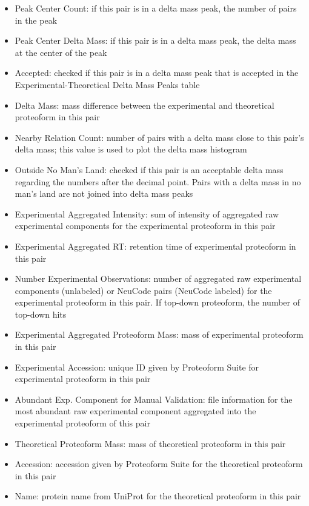\begin{itemize}
\begin{figure}[h]
\end{figure}
\begin{itemize}
	\item Peak Center Count: if this pair is in a delta mass peak, the number of pairs in the peak
	\item Peak Center Delta Mass: if this pair is in a delta mass peak, the delta mass at the center of the peak
	\item Accepted: checked if this pair is in a delta mass peak that is accepted in the Experimental-Theoretical Delta Mass Peaks table
	\item Delta Mass: mass difference between the experimental and theoretical proteoform in this pair
	\item Nearby Relation Count: number of pairs with a delta mass close to this pair's delta mass; this value is used to plot the delta mass histogram
	\item Outside No Man's Land: checked if this pair is an acceptable delta mass regarding the numbers after the decimal point. Pairs with a delta mass in no man's land are not joined into delta mass peaks
	\item Experimental Aggregated Intensity: sum of intensity of aggregated raw experimental components for the experimental proteoform in this pair
	\item Experimental Aggregated RT: retention time of experimental proteoform in this pair
	\item Number Experimental Observations: number of aggregated raw experimental components (unlabeled) or NeuCode pairs (NeuCode labeled) for the experimental proteoform in this pair. If top-down proteoform, the number of top-down hits
	\item Experimental Aggregated Proteoform Mass: mass of experimental proteoform in this pair
	\item Experimental Accession: unique ID given by Proteoform Suite for experimental proteoform in this pair		
	\item Abundant Exp. Component for Manual Validation: file information for the most abundant raw experimental component aggregated into the experimental proteoform of this pair
	\item Theoretical Proteoform Mass: mass of theoretical proteoform in this pair
	\item Accession: accession given by Proteoform Suite for the theoretical proteoform in this pair
	\item Name: protein name from UniProt for the theoretical proteoform in this pair

\end{itemize}
\end{itemize}
